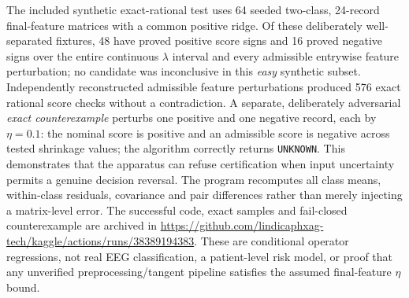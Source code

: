 The included synthetic exact-rational test uses
64 seeded two-class, 24-record final-feature matrices
with a common positive ridge. Of these deliberately
well-separated fixtures, 48 have proved positive
score signs and 16 proved negative signs over the
entire continuous $\lambda$ interval and every
admissible entrywise feature perturbation; no
candidate was inconclusive in this \emph{easy}
synthetic subset. Independently reconstructed
admissible feature perturbations produced 576 exact
rational score checks without a contradiction.
A separate, deliberately adversarial \emph{exact
counterexample} perturbs one positive and one
negative record, each by $\eta=0.1$: the nominal
score is positive and an admissible score is
negative across tested shrinkage values; the
algorithm correctly returns \texttt{UNKNOWN}.
This demonstrates that the apparatus can
refuse certification when input uncertainty
permits a genuine decision reversal.
The program recomputes all class means,
within-class residuals, covariance and pair
differences rather than merely injecting
a matrix-level error. The successful code,
exact samples and fail-closed counterexample
are archived in
\url{https://github.com/lindicaphxag-tech/kaggle/actions/runs/38389194383}.
These are conditional operator regressions,
not real EEG classification, a patient-level
risk model, or proof that any unverified
preprocessing/tangent pipeline satisfies
the assumed final-feature $\eta$ bound.

